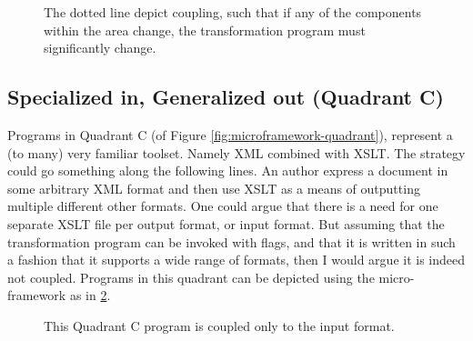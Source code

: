 \documentclass{scrreprt}
\begin{document}
\begin{figure}[p]
  \centering


  \caption{The dotted line depict coupling, such that if any of the components within the area change, the transformation program must significantly change.}
  \label{fig:workflows-framework-spec-in-spec-out}
\end{figure}



\subsection{Specialized in, Generalized out (Quadrant C)}
Programs in Quadrant C (of Figure \ref{fig:microframework-quadrant}), represent a (to many) very familiar toolset. Namely XML combined with XSLT. The strategy could go something along the following lines. An author express a document in some arbitrary XML format and then use XSLT as a means of outputting multiple different other formats. One could argue that there is a need for one separate XSLT file per output format, or input format. But assuming that the transformation program can be invoked with flags, and that it is written in such a fashion that it supports a wide range of formats, then I would argue it is indeed not coupled. Programs in this quadrant can be depicted using the micro-framework as in \ref{fig:workflows-framework-spec-in-gen-out}.

\begin{figure}[p]
  \centering


  \caption{This Quadrant C program is coupled only to the input format.}
  \label{fig:workflows-framework-spec-in-gen-out}
\end{figure}
\end{document}
